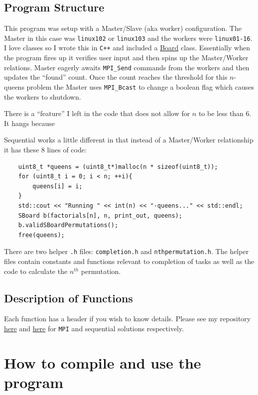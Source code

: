 \documentclass{article}
\begin{document}
\subsection{Program Structure}
This program was setup with a Master/Slave (aka worker) configuration. The 
Master in this case was \verb|linux102| or \verb|linux103| and the workers were 
\verb|linux01-16|. I love classes so I wrote this in \verb|C++| and included a 
\href{}{Board} class. Essentially when the program fires up it verifies user 
input and then spins up the Master/Worker relations. Master eagerly awaits 
\verb|MPI_Send| commands from the workers and then updates the ``found'' count. 
Once the count reaches the threshold for this $n$-queens problem the Master uses 
\verb|MPI_Bcast| to change a boolean flag which causes the workers to shutdown. 

There is a ``feature'' I left in the code that does not allow for $n$ to be less 
than 6. It hangs because 

Sequential works a little different in that instead of a Master/Worker 
relationship it has these 8 lines of code:

\begin{verbatim}
    uint8_t *queens = (uint8_t*)malloc(n * sizeof(uint8_t));
    for (uint8_t i = 0; i < n; ++i){
        queens[i] = i;
    }
    std::cout << "Running " << int(n) << "-queens..." << std::endl;
    SBoard b(factorials[n], n, print_out, queens);
    b.validSBoardPermutations();
    free(queens);
\end{verbatim}

There are two helper \verb|.h| files: \verb|completion.h| and 
\verb|nthpermutation.h|. The helper files contain constants and functions 
relevant to completion of tasks as well as the code to calculate the $n^{th}$ 
permutation.

\subsection{Description of Functions}
Each function has a header if you wish to know details. Please see my repository 
\href{https://github.com/macattackftw/HighPerfComputing/tree/master/final}{here} 
and 
\href{https://github.com/macattackftw/HighPerfComputing/tree/master/seqfinal}{here} 
for \verb|MPI| and sequential solutions respectively.

\newpage
\section{How to compile and use the program}
\end{document}
